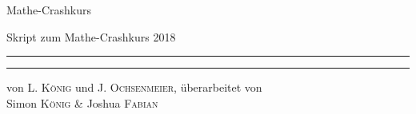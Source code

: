 \documentclass[a4paper, oneside, 20pt]{extarticle}
\begin{document}
\pagestyle{empty}
\centering
{\huge Mathe-Crashkurs}

{\color{gray} Skript zum Mathe-Crashkurs 2018
\color{darkgray}\rule{0.8\textwidth}{0.7pt}
}


  \vfill


{\tiny\color{darkgray}\rule{0.5\textwidth}{0.5pt}
\vspace{0.5em}

\tiny\color{gray}von L. \textsc{König} und J. \textsc{Ochsenmeier}, überarbeitet von
\\\small Simon \textsc{König} \& Joshua \textsc{Fabian}}
\end{document}
